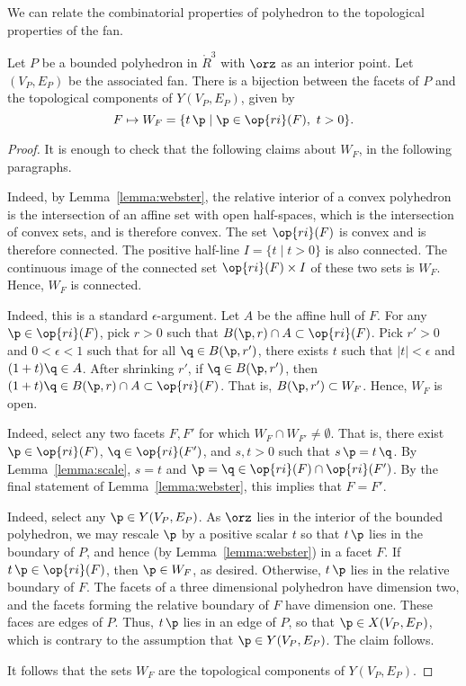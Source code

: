 We can relate the combinatorial properties of polyhedron to the topological
properties of the fan.

\begin{lemma}[]\cutrate{}\label{lemma:WF} 
Let $P$ be a bounded polyhedron in $\ring{R}^3$ with $\orz$ as an
interior point.  Let $(V_P,E_P)$ be the associated fan.  There is a
bijection between the facets of $P$ and the topological components
of $Y(V_P,E_P)$, given by
\[ 
F \mapsto W_F = \{t\, \p \mid \p\in \op{ri}(F),~t >0\}.
\] 
\end{lemma}
%

\begin{proof} It is enough to check that the following claims
about $W_F$,  in the following paragraphs.

 Indeed, by Lemma~\ref{lemma:webster},
the relative interior of a convex polyhedron is the intersection of
an affine set with open half-spaces, which is the intersection of
convex sets, and is therefore convex. The set $\op{ri}(F)$ is
convex and is therefore connected.  The positive half-line $I=\{t\mid t>0\}$
is also connected.  The continuous image of the connected set
$\op{ri}(F)\times I$ of these two sets is $W_F$.  Hence, $W_F$ is
connected.

  Indeed, this is a standard
$\epsilon$-argument.  Let $A$ be the affine hull of $F$.  For any
$\p\in \op{ri}(F)$, pick $r>0$ such that $B(\p,r)\cap A\subset
\op{ri}(F)$.  Pick $r'>0$ and $0<\epsilon<1$ such that for all
$\q\in B(\p,r')$, there exists $t$ such that $|t|<\epsilon$ and
$(1+t)\q\in A$.  After shrinking $r'$, if $\q\in B(\p,r')$, then
$(1+t)\q \in B(\p,r)\cap A \subset \op{ri}(F)$.  That is,
$B(\p,r')\subset W_F$.  Hence, $W_F$ is open.

  Indeed, select any two facets $F,F'$ for
which $W_F\cap W_{F'}\ne \emptyset$.  That is, there exist $\p\in
\op{ri}(F)$, $\q\in \op{ri}(F')$, and $s,t>0$ such that $s\, \p = t\,
\q$.  By Lemma~\ref{lemma:scale}, $s=t$ and $\p=\q\in \op{ri}(F)\cap
\op{ri}(F')$.  By the final statement of Lemma~\ref{lemma:webster},
this implies that $F=F'$.

  Indeed,
select any $\p\in Y(V_P,E_P)$.  As $\orz$ lies in the interior of
the bounded polyhedron, we may rescale $\p$ by a positive scalar $t$
so that $t\, \p$ lies in the boundary of $P$, and hence (by
Lemma~\ref{lemma:webster}) in a facet $F$.  If $t\, \p \in
\op{ri}(F)$, then $\p\in W_F$, as desired.  Otherwise, $t\, \p$ lies
in the relative boundary of $F$.  The facets of a three dimensional
polyhedron have dimension two, and the facets forming the relative
boundary of $F$ have dimension one.  These faces are edges of $P$.
Thus, $t\, \p$ lies in an edge of $P$, so that $\p\in X(V_P,E_P)$,
which is contrary to the assumption that $\p\in Y(V_P,E_P)$.  The
claim follows.

It follows that the sets $W_F$ are the
topological components of $Y(V_P,E_P)$.
\end{proof}
%

